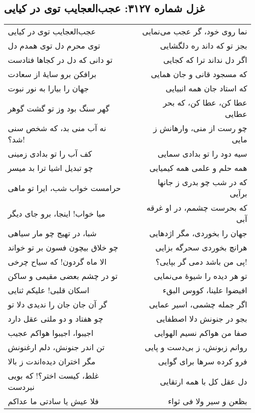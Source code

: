 \begin{center}
\section*{غزل شماره ۳۱۲۷: عجب‌العجایب توی در کیایی}
\label{sec:3127}
\begin{longtable}{l p{0.5cm} r}
عجب‌العجایب توی در کیایی
&&
نما روی خود، گر عجب می‌نمایی
\\
توی محرم دل توی همدم دل
&&
بجز تو که داند ره دلگشایی
\\
تو دانی که دل در کجاها فتادست
&&
اگر دل نداند ترا که کجایی
\\
برافکن برو سایهٔ از سعادت
&&
که مسجود قانی و جان همایی
\\
جهان را بیارا به نور نبوت
&&
که استاد جان همه انبیایی
\\
گهر سنگ بود وز تو گشت گوهر
&&
عطا کن، عطا کن، که بحر عطایی
\\
نه آب منی بد، که شخص سنی شد؟!
&&
چو رست از منی، وارهانش ز مایی
\\
کف آب را تو بدادی زمینی
&&
سیه دود را تو بدادی سمایی
\\
چو تبدیل اشیا ترا بد میسر
&&
همه حلم و علمی همه کیمیایی
\\
حرامست خواب شب، ایرا تو ماهی
&&
که در شب چو بدری ز جانها برآیی
\\
میا خواب! اینجا، برو جای دیگر
&&
که بحرست چشمم، در او غرقه آبی
\\
شبا، در تهیج چو مار سیاهی
&&
جهان را بخوردی، مگر اژدهایی
\\
چو خلاق بیچون فسون بر تو خواند
&&
هرانچ بخوردی سحرگه بزایی
\\
الا ماه گردون! که سیاح چرخی
&&
پی من باشد دمی گر بپایی؟!
\\
تو در چشم بعضی مقیمی و ساکن
&&
تو هر دیده را شیوهٔ می‌نمایی
\\
اسکان قلبی! علیکم ثنایی
&&
افیضوا علینا، کووس البقء
\\
گر آن جان جان را ندیدی دلا تو
&&
اگر جمله چشمی، اسیر عمایی
\\
چو هفتاد و دو ملتی عقل دارد
&&
بجو در جنونش دلا اصطفایی
\\
اجیبوا، اجیبوا هواکم عجیب
&&
صفا من هواکم نسیم الهوایی
\\
تن اندر جنونش، دلم ارغنونش
&&
روانم زبونش، ز بی‌دست و پایی
\\
مگر اختران دیده‌اندت ز بالا
&&
فرو کرده سرها برای گوایی
\\
غلط، کیست اختر؟! که بویی نبردست
&&
دل عقل کل با همه ارتقایی
\\
فلا عیش یا سادتی ما عداکم
&&
بظعن و سیر ولا فی ثواء
\\
\end{longtable}
\end{center}
